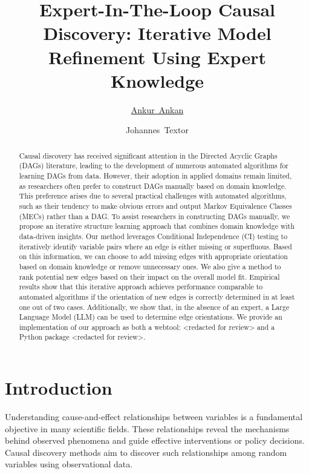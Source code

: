 \documentclass{uai2025} %
\title{Expert-In-The-Loop Causal Discovery: Iterative Model Refinement Using Expert Knowledge}
\author[1]{\href{mailto:<ankur.ankan@ru.nl>?Subject=Your UAI 2025 paper}{Ankur~Ankan}{}}
\author[1]{Johannes~Textor}
\affil[1]{%
    Institute for Computing and Information Sciences\\
    Radboud University\\
    Nijmegen, The Netherlands
}
\begin{document}
\maketitle

\begin{abstract}

	Causal discovery has received significant attention in the Directed
	Acyclic Graphs (DAGs) literature, leading to the development of
	numerous automated algorithms for learning DAGs from data. However,
	their adoption in applied domains remain limited, as researchers often
	prefer to construct DAGs manually based on domain knowledge. This
	preference arises due to several practical challenges with automated
	algorithms, such as their tendency to make obvious errors and output
	Markov Equivalence Classes (MECs) rather than a DAG. To assist
	researchers in constructing DAGs manually, we propose an iterative 
	structure learning approach that combines domain knowledge with data-driven
	insights. Our method leverages Conditional Independence (CI) testing to
	iteratively identify variable pairs where an edge is either missing or
	superfluous. Based on this information, we can choose to add missing
	edges with appropriate orientation based on domain knowledge or remove
	unnecessary ones. We also give a method to rank potential new edges
	based on their impact on the overall model fit. Empirical results show
	that this iterative approach achieves performance comparable to
	automated algorithms if the orientation of new edges is correctly
	determined in at least one out of two cases. Additionally, we show
	that, in the absence of an expert, a Large Language Model (LLM) can be
	used to determine edge orientations. We provide an implementation of
	our approach as both a webtool: <redacted for review> and a Python
	package <redacted for review>.

\end{abstract}

\section{Introduction}
Understanding cause-and-effect relationships between variables is a fundamental
objective in many scientific fields. These relationships reveal the mechanisms
behind observed phenomena and guide effective interventions or policy
decisions. Causal discovery methods aim to discover such relationships
among random variables using observational data. 
\end{document}
